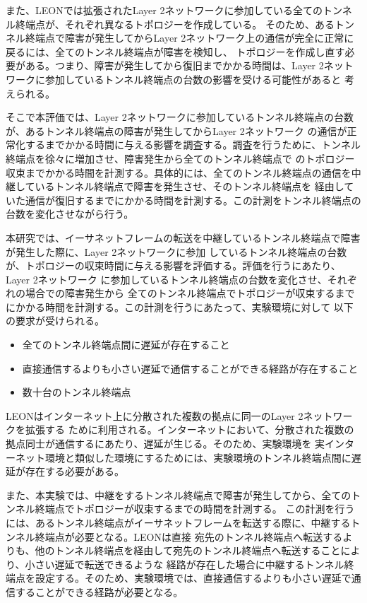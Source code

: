 また、LEONでは拡張されたLayer 2ネットワークに参加している全てのトンネル終端点が、それぞれ異なるトポロジーを作成している。
そのため、あるトンネル終端点で障害が発生してからLayer 2ネットワーク上の通信が完全に正常に戻るには、全てのトンネル終端点が障害を検知し、
トポロジーを作成し直す必要がある。つまり、障害が発生してから復旧までかかる時間は、Layer 2ネットワークに参加しているトンネル終端点の台数の影響を受ける可能性があると
考えられる。

そこで本評価では、Layer 2ネットワークに参加しているトンネル終端点の台数が、あるトンネル終端点の障害が発生してからLayer 2ネットワーク
の通信が正常化するまでかかる時間に与える影響を調査する。調査を行うために、トンネル終端点を徐々に増加させ、障害発生から全てのトンネル終端点で
のトポロジー収束までかかる時間を計測する。具体的には、全てのトンネル終端点の通信を中継しているトンネル終端点で障害を発生させ、そのトンネル終端点を
経由していた通信が復旧するまでにかかる時間を計測する。この計測をトンネル終端点の台数を変化させながら行う。

本研究では、イーサネットフレームの転送を中継しているトンネル終端点で障害が発生した際に、Layer 2ネットワークに参加
しているトンネル終端点の台数が、トポロジーの収束時間に与える影響を評価する。評価を行うにあたり、Layer 2ネットワーク
に参加しているトンネル終端点の台数を変化させ、それぞれの場合での障害発生から
全てのトンネル終端点でトポロジーが収束するまでにかかる時間を計測する。この計測を行うにあたって、実験環境に対して
以下の要求が受けられる。

\begin{itemize}
	\item{全てのトンネル終端点間に遅延が存在すること}
	\item{直接通信するよりも小さい遅延で通信することができる経路が存在すること}
	\item{数十台のトンネル終端点}
\end{itemize}

LEONはインターネット上に分散された複数の拠点に同一のLayer 2ネットワークを拡張する
ために利用される。インターネットにおいて、分散された複数の拠点同士が通信するにあたり、遅延が生じる。そのため、実験環境を
実インターネット環境と類似した環境にするためには、実験環境のトンネル終端点間に遅延が存在する必要がある。

また、本実験では、中継をするトンネル終端点で障害が発生してから、全てのトンネル終端点でトポロジーが収束するまでの時間を計測する。
この計測を行うには、あるトンネル終端点がイーサネットフレームを転送する際に、中継するトンネル終端点が必要となる。LEONは直接
宛先のトンネル終端点へ転送するよりも、他のトンネル終端点を経由して宛先のトンネル終端点へ転送することにより、小さい遅延で転送できるような
経路が存在した場合に中継するトンネル終端点を設定する。そのため、実験環境では、直接通信するよりも小さい遅延で通信することができる経路が必要となる。

